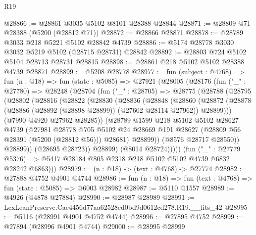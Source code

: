 \begin{lexlean}{R19}
\begin{coremodule}
{{{{{{{{{{{@28866 := @28861 @3035 @5102 @8101 @28388 @28844
@28871 := @28809 @71 @28388 (@5200 (@28812 @71))
@28872 := @28866 @28871
@28878 := @28789 @3033 @218 @5221 @5102 @28842 @4739
@28886 := @5174 @28778 @3030 @3032 @5219 @5102 (@28715 @28731) @28842
@28892 := @28803 @724 @5102 @5104 @28713 @28731 @28815
@28898 := @28861 @218 @5102 @5102 @28388 @4739 @28871
@28899 := @5208 @28778
@28977 := fun (subject : @4768) =>
  fun (n : @18) =>
  fun (state : @5085) =>
  @27921
    (@28005
      (@28176
        (fun ("_" : @27780) =>
        @28248
          (@28704
            (fun ("_" : @28705) =>
            @28775
              (@28788
                (@28795
                  (@28802
                    (@28816
                      (@28822
                        (@28830
                          (@28836
                            (@28848
                              (@28860
                                (@28872
                                  (@28878
                                    (@28886 (@28892 (@28898 @28899)) (@27602 @28114 @27962))
                                    @28899)))
                              (@7990 @4920 @27962 @28285))
                            (@28789
                              @1599
                              @218
                              @5102
                              @5102
                              @28627
                              @4739
                              (@27981
                                @28778
                                @705
                                @5102
                                @24
                                @28669
                                @191
                                @28627
                                (@28809 @56 @28391 (@5200 (@28812 @56)))
                                @28681)
                              @28899))
                          (@8576 @28717 @28550))
                        @28899))
                    (@28695 @28723))
                  @28899)
                (@8014 @28724)))))
        (fun ("_" : @27779 @5376) =>
        @5417 @28184 @805 @2318 @218 @5102 @5102 @4739 @6832 @28242 @6863)))
@28979 := (n : @18) -> (text : @4768) -> @27774
@28982 := @27888 @4752 @4901 @4744
@28986 := fun (n : @18) => fun (text : @4768) => fun (state : @5085) => @6003 @28982
@28987 := @5110 @1557
@28989 := @4926 (@4878 @27884)
@28990 := @28987 @28989
@28991 := LexLeanPreserve.Cae4456d77aa62528ed0bd9d0612cd278.R19.__fits_42
@28995 := @5116 (@28991 @4901 @4752 @4744)
@28996 := @27895 @4752
@28999 := @27894 (@28996 @4901 @4744)
@29000 := @28995 @28999
}}}}}}}}}}}
\end{coremodule}
\end{lexlean}
